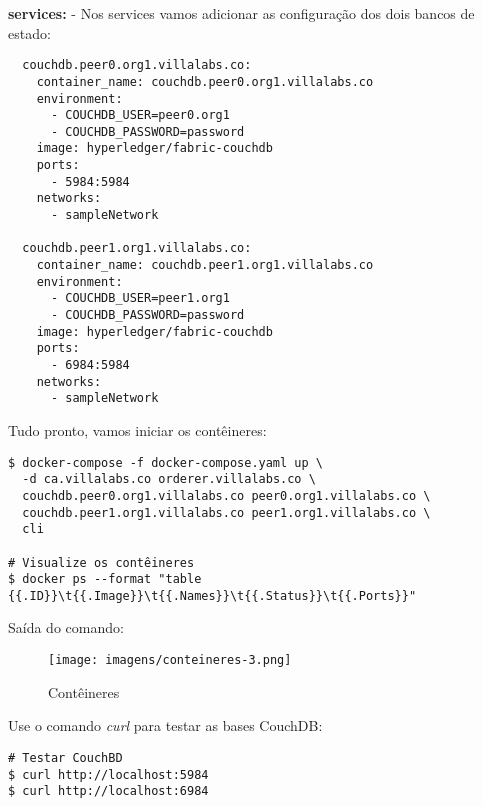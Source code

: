 \documentclass[a4paper,11pt]{article}
\begin{document}
\textbf{services:} - Nos services vamos adicionar as configuração dos dois bancos de estado:
\begin{lstlisting}
  couchdb.peer0.org1.villalabs.co:
    container_name: couchdb.peer0.org1.villalabs.co
    environment:
      - COUCHDB_USER=peer0.org1
      - COUCHDB_PASSWORD=password
    image: hyperledger/fabric-couchdb
    ports: 
      - 5984:5984
    networks: 
      - sampleNetwork

  couchdb.peer1.org1.villalabs.co:
    container_name: couchdb.peer1.org1.villalabs.co
    environment:
      - COUCHDB_USER=peer1.org1
      - COUCHDB_PASSWORD=password
    image: hyperledger/fabric-couchdb
    ports: 
      - 6984:5984
    networks: 
      - sampleNetwork
\end{lstlisting}

Tudo pronto, vamos iniciar os contêineres:
\begin{lstlisting}
$ docker-compose -f docker-compose.yaml up \
  -d ca.villalabs.co orderer.villalabs.co \
  couchdb.peer0.org1.villalabs.co peer0.org1.villalabs.co \
  couchdb.peer1.org1.villalabs.co peer1.org1.villalabs.co \
  cli

# Visualize os contêineres
$ docker ps --format "table {{.ID}}\t{{.Image}}\t{{.Names}}\t{{.Status}}\t{{.Ports}}"
\end{lstlisting}

Saída do comando:
\begin{figure}[H]
  \centering
  \texttt{[image: imagens/conteineres-3.png]}
  \caption{Contêineres}
\end{figure}

Use o comando \textit{curl} para testar as bases CouchDB:
\begin{lstlisting}
# Testar CouchBD
$ curl http://localhost:5984
$ curl http://localhost:6984
\end{lstlisting}
\end{document}
